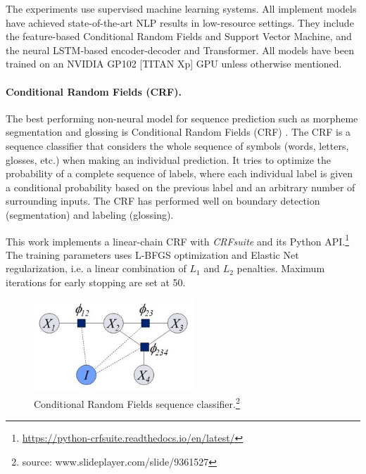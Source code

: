 The experiments use supervised machine learning systems. All implement models have achieved state-of-the-art NLP results in low-resource settings. They include the feature-based Conditional Random Fields and Support Vector Machine, and the neural LSTM-based encoder-decoder and Transformer. All models have been trained on an NVIDIA GP102 [TITAN Xp] GPU unless otherwise mentioned.

\paragraph{Conditional Random Fields (CRF).} The best performing non-neural model for sequence prediction such as morpheme segmentation and glossing is Conditional Random Fields (CRF) \citep{lafferty_conditional_2001,muller_efficient_2013,ruokolainen_comparative_2016}. The CRF is a sequence classifier that considers the whole sequence of symbols (words, letters, glosses, etc.) when making an individual prediction. It tries to optimize the probability of a complete sequence of labels, where each individual label is given a conditional probability based on the previous label and an arbitrary number of surrounding inputs. %
The CRF has performed well on boundary detection (segmentation) and labeling (glossing). 

This work implements a linear-chain CRF \citep{lafferty_conditional_2001} with \textit{CRFsuite} \citep{okazaki2007} and its Python API.\footnote{\url{https://python-crfsuite.readthedocs.io/en/latest/}} The training parameters uses L-BFGS optimization \citep{liu1989} and Elastic Net regularization, i.e. a linear combination of $L_1$ and $L_2$ penalties. Maximum iterations for early stopping are set at 50.


\begin{figure}
    \centering
    \includegraphics[width=6cm]{figs/CRF.jpg}
    \caption[Conditional Random Fields]{Conditional Random Fields sequence classifier.\footnote{source: www.slideplayer.com/slide/9361527}}
    \label{fig:CRF}
\end{figure}


